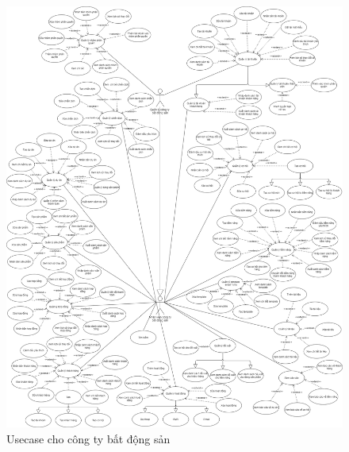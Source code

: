 \documentclass[12pt,a4paper]{article}
\begin{document}
    \begin{figure}[H]
        \centering \includegraphics[width=\textwidth]{Img/Usecase/usecase_company.png}
        \vspace{0.5cm}
        \caption{Usecase cho công ty bất động sản}
        \label{usecasecompany}
    \end{figure}
\end{document}
